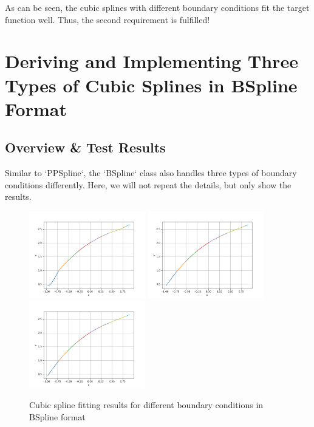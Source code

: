 \documentclass[a4paper]{article}
\begin{document}
As can be seen, the cubic splines with different boundary conditions fit the target function well. Thus, the second requirement is fulfilled!

\section{Deriving and Implementing Three Types of Cubic Splines in BSpline Format}

\subsection{Overview \& Test Results}

Similar to `PPSpline`, the `BSpline` class also handles three types of boundary conditions differently. Here, we will not repeat the details, but only show the results.

\begin{figure}[H]
    \centering
    \includegraphics[width=0.45\textwidth]{./figure/check/P3_s23_clamped.png}
    \includegraphics[width=0.45\textwidth]{./figure/check/P3_s23_natural.png}
    \includegraphics[width=0.45\textwidth]{./figure/check/P3_s23_periodic.png}
    \caption{Cubic spline fitting results for different boundary conditions in BSpline format}
\end{figure}
\end{document}
